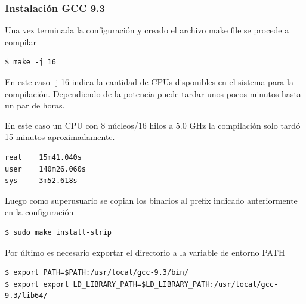 \documentclass[12pt]{article}
\begin{document}
\subsubsection{Instalación GCC 9.3}

Una vez terminada la configuración y creado el archivo make file se procede a compilar

\begin{lstlisting}[frame=single]
$ make -j 16
\end{lstlisting}
En este caso -j 16 indica la cantidad de CPUs disponibles en el sistema para la compilación. Dependiendo de la potencia puede tardar unos pocos minutos hasta un par de horas.

En este caso un CPU con 8 núcleos/16 hilos a 5.0 GHz la compilación solo tardó 15 minutos aproximadamente. 

\begin{lstlisting}[frame=single]
real    15m41.040s
user    140m26.060s
sys     3m52.618s
\end{lstlisting}

Luego como superusuario se copian los binarios al prefix indicado anteriormente en la configuración
\begin{lstlisting}[frame=single]
$ sudo make install-strip
\end{lstlisting}

Por último es necesario exportar el directorio a la variable de entorno PATH
\begin{lstlisting}[frame=single]
$ export PATH=$PATH:/usr/local/gcc-9.3/bin/
$ export export LD_LIBRARY_PATH=$LD_LIBRARY_PATH:/usr/local/gcc-9.3/lib64/
\end{lstlisting}
\end{document}

